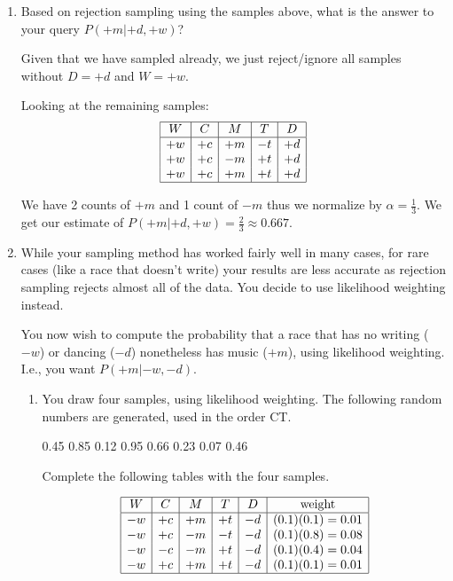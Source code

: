 \documentclass[12pt]{article}
\begin{document}
\begin{enumerate}

\item Based on rejection sampling using the samples above, what is the
  answer to your query $P(+m | +d, +w)$?

Given that we have sampled already, we just reject/ignore all samples without $D=+d$ and $W=+w$.

Looking at the remaining samples: 
$$\begin{array}{|c|c|c|c|c|} \hline
W  & C  & M  & T  & D  \\ \hline
+w & +c & +m & -t & +d \\
+w & +c & -m & +t & +d \\
+w & +c & +m & +t & +d \\ \hline
\end{array}$$

We have 2 counts of $+m$ and 1 count of $-m$ thus we normalize by $\alpha = \frac{1}{3}$. 
We get our estimate of $P(+m|+d,+w) = \frac{2}{3} \approx 0.667$.

\item While your sampling method has worked fairly well in many cases,
  for rare cases (like a race that doesn't write) your results
  are less accurate as rejection sampling rejects almost all of the
  data.  You decide to use likelihood weighting instead.

You now wish to compute the probability that a race that has no
writing ($-w$) or dancing ($-d$) nonetheless has music ($+m$), using
likelihood weighting. I.e., you want $P(+m | -w, -d)$.

\begin{enumerate}

\item You draw four samples, using likelihood weighting.  The
  following random numbers are generated, used in the order CT.

\begin{center}
0.45 0.85 0.12 0.95 0.66 0.23 0.07 0.46 
\end{center}

Complete the following tables with the four samples.

$$\begin{array}{|c|c|c|c|c|c|} \hline
W  & C  & M  & T  & D  & \hbox{weight} \\ \hline
-w & +c & +m & +t & -d & (0.1)(0.1)=0.01\\
-w & +c & -m & -t & -d & (0.1)(0.8)=0.08\\
-w & -c & -m & +t & -d & (0.1)(0.4)=0.04\\
-w & +c & +m & +t & -d & (0.1)(0.1)=0.01\\ \hline
\end{array}$$


\end{enumerate}
\end{enumerate}
\end{document}
